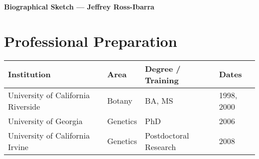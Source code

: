 \documentclass[10pt]{article}
\begin{document}
\begin{center}
		\sf\textbf{{Biographical Sketch --- Jeffrey Ross-Ibarra}}
\end{center}



\section{Professional Preparation}

\begin{tabular}{l l l l}
Institution    \hspace{52mm}              &   Area  \hspace{10mm}     & Degree / Training  \hspace{13mm}    & Dates \\
\hline
University of California Riverside & Botany & BA, MS & 1998, 2000 \\
University of Georgia & Genetics & PhD & 2006\\
University of California Irvine & Genetics & Postdoctoral Research & 2008 \\
\end{tabular}
\end{document}
